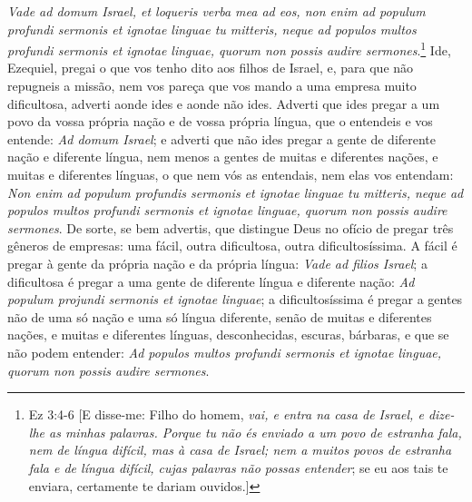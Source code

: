 \emph{Vade ad domum Israel, et loqueris verba mea ad eos, non enim ad
populum profundi sermonis et ignotae linguae tu mitteris, neque ad
populos multos profundi sermonis et ignotae linguae, quorum non possis
audire sermones}.\footnote{Ez 3:4-6 [E disse-me: Filho do homem, \emph{vai, e entra na casa de Israel, e dize-lhe as minhas palavras.
Porque tu não és enviado a um povo de estranha fala, nem de língua difícil, mas à casa de Israel; nem a muitos povos de estranha fala e de língua difícil, cujas palavras não possas entender}; se eu aos tais te enviara, certamente te dariam ouvidos.]} Ide, Ezequiel, pregai o que vos tenho dito aos filhos de Israel, e, para que não repugneis a missão, nem vos
pareça que vos mando a uma empresa muito dificultosa, adverti aonde ides
e aonde não ides. Adverti que ides pregar a um povo da vossa própria
nação e de vossa própria língua, que o entendeis e vos entende: \emph{Ad
domum Israel}; e adverti que não ides pregar a gente de diferente nação
e diferente língua, nem menos a gentes de muitas e diferentes nações, e
muitas e diferentes línguas, o que nem vós as entendais, nem elas vos
entendam: \emph{Non enim ad populum profundis sermonis et ignotae
linguae tu mitteris, neque ad populos multos profundi sermonis et
ignotae linguae, quorum non possis audire sermones}. De sorte, se bem
advertis, que distingue Deus no ofício de pregar três gêneros de
empresas: uma fácil, outra dificultosa, outra dificultosíssima. A fácil
é pregar à gente da própria nação e da própria língua: \emph{Vade ad
filios Israel}; a dificultosa é pregar a uma gente de diferente língua e
diferente nação: \emph{Ad populum projundi sermonis et ignotae linguae};
a dificultosíssima é pregar a gentes não de uma só nação e uma só língua
diferente, senão de muitas e diferentes nações, e muitas e diferentes
línguas, desconhecidas, escuras, bárbaras, e que se não podem entender:
\emph{Ad populos multos profundi sermonis et ignotae linguae, quorum non
possis audire sermones}.

